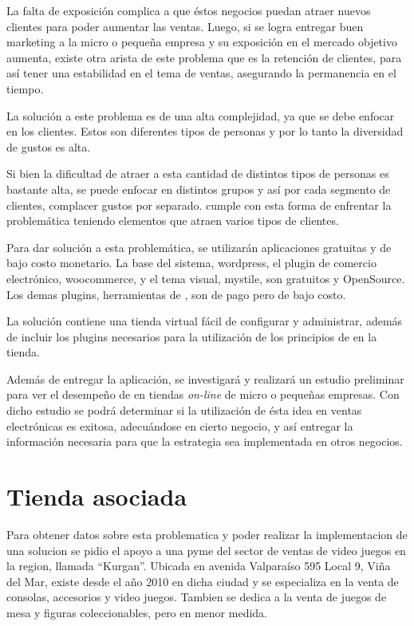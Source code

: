 La falta de exposición complica a que éstos negocios puedan atraer nuevos clientes
para poder aumentar las ventas.
Luego, si se logra entregar buen marketing a la micro o pequeña empresa y su
exposición en el mercado objetivo aumenta, existe otra arista de este problema
que es la retención de clientes, para así tener una estabilidad en el tema
de ventas, asegurando la permanencia en el tiempo.

La solución a este problema es de una alta complejidad, ya que se debe enfocar en
los clientes.
Estos son diferentes tipos de personas y por lo tanto la diversidad de gustos es
alta.

Si bien la dificultad de atraer a esta cantidad de distintos tipos de personas
es bastante alta, se puede enfocar en distintos grupos y así por cada segmento
de clientes, complacer gustos por separado.
{\GAM} cumple con esta forma de enfrentar la problemática teniendo elementos que
atraen varios tipos de clientes.

Para dar solución a esta problemática, se utilizarán aplicaciones gratuitas y de
bajo costo monetario. La base del sistema, wordpress, el plugin de comercio
electrónico, woocommerce, y el tema visual, mystile, son gratuitos y OpenSource.
Los demas plugins, herramientas de {\GAM}, son de pago pero de bajo costo.

La solución contiene una tienda virtual fácil de configurar y administrar,
además de incluir los plugins necesarios para la utilización de los principios
de {\GAM} en la tienda.

Además de entregar la aplicación, se investigará y realizará un estudio preliminar
para ver el desempeño de {\GAM} en tiendas \emph{on-line} de micro o pequeñas empresas.
Con dicho estudio se podrá determinar si la utilización de ésta idea en ventas
electrónicas es exitosa, adecuándose en cierto negocio,
y así entregar la información necesaria para que la estrategia sea implementada
en otros negocios.

\section{Tienda asociada}

Para obtener datos sobre esta problematica y poder realizar la implementacion de una
solucion se pidio el apoyo a una pyme del sector de ventas de video juegos en la region,
llamada ``Kurgan''. Ubicada en avenida Valparaíso 595 Local 9, Viña del Mar, existe desde
el año 2010 en dicha ciudad y se especializa en la venta de consolas, accesorios y video juegos.
Tambien se dedica a la venta de juegos de mesa y figuras coleccionables, pero en menor medida.

